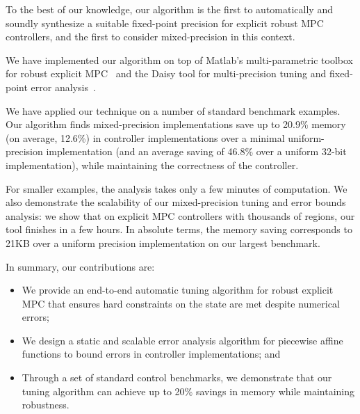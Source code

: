 To the best of our knowledge, our algorithm is the first to automatically and soundly
synthesize a suitable fixed-point precision for explicit robust MPC controllers,
and the first to consider mixed-precision in this context.

We have implemented our algorithm on top of Matlab's multi-parametric toolbox 
for robust explicit MPC~\cite{matlabMPT}
and the Daisy tool for multi-precision tuning and fixed-point error analysis~\cite{Daisy}.

We have applied our technique on a number of standard benchmark examples.
Our algorithm finds mixed-precision implementations  save up to 20.9\%
memory (on average, 12.6\%) in controller implementations over a minimal
uniform-precision implementation (and an average saving of 46.8\% over a uniform
32-bit implementation), while maintaining the correctness of the controller.

For smaller examples, the analysis takes only a few minutes of computation.
We also demonstrate the scalability of our mixed-precision tuning and error bounds analysis:
we show that on explicit MPC controllers with thousands of regions, our tool finishes in a few hours.
In absolute terms, the memory saving corresponds to 21KB over a uniform
precision implementation on our largest benchmark.

In summary, our contributions are:
\begin{itemize}
\item We provide an end-to-end automatic tuning algorithm for robust explicit MPC that ensures
hard constraints on the state are met despite numerical errors;
\item We design a static and scalable error analysis algorithm for piecewise affine functions to bound
errors in controller implementations; and
\item Through a set of standard control benchmarks, we demonstrate that our tuning algorithm
can achieve up to 20\% savings in memory while maintaining robustness.
\end{itemize} 

